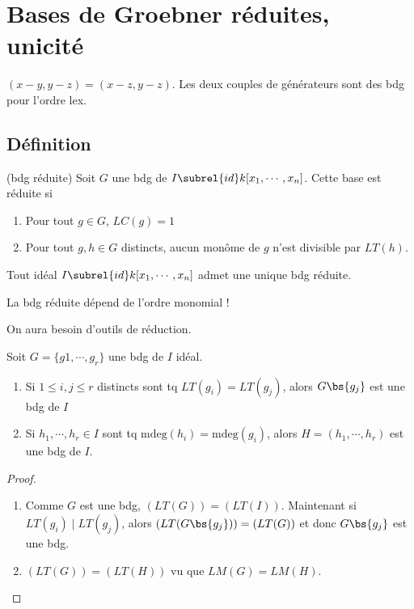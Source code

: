     \section{Bases de Groebner réduites, unicité}
        \begin{expl}
            $(x-y,y-z) = (x-z, y-z)$. Les deux couples de générateurs sont des bdg pour l'ordre lex.
        \end{expl}
        \subsection{Définition}
            \begin{defi} (bdg réduite)
                Soit $G$ une bdg de $I \subrel{id} k[x_1, \cdots, x_n]$. Cette base est réduite si
                \begin{enumerate}
                    \item Pour tout $g \in G$, $LC(g) = 1$
                    \item Pour tout $g,h \in G$ distincts, aucun monôme de $g$ n'est divisible par $LT(h)$.
                \end{enumerate}
            \end{defi}
            \begin{theo}
                \label{1.5.1}
                Tout idéal $I \subrel{id} k[x_1, \cdots, x_n]$ admet une unique bdg réduite.
            \end{theo}
            \begin{remq}
                La bdg réduite dépend de l'ordre monomial !
            \end{remq}
            On aura besoin d'outils de réduction.
            \begin{lemm}
                Soit $G = \{g1, \cdots, g_r\}$ une bdg de $I$ idéal.
                \begin{enumerate}
                    \item Si $1 \leq i,j \leq r$ distincts sont tq $LT(g_i) = LT(g_j)$, alors $G \bs \{g_j\}$ est une bdg de $I$
                    \item Si $h_1, \cdots, h_r \in I$ sont tq $\mathrm{mdeg}(h_i) = \mathrm{mdeg}(g_i)$, alors $H = (h_1, \cdots, h_r)$ est une bdg de $I$.
                \end{enumerate}
            \end{lemm}
            \begin{proof}
                \begin{enumerate}
                    \item Comme $G$ est une bdg, $(LT(G)) = (LT(I))$. Maintenant si $LT(g_i) \mid LT(g_j)$, alors $(LT(G \bs \{g_j\})) = (LT(G))$ et donc $G \bs \{g_j\}$ est une bdg.
                    \item $(LT(G)) = (LT(H))$ vu que $LM(G) = LM(H)$.
                \end{enumerate}
            \end{proof}
